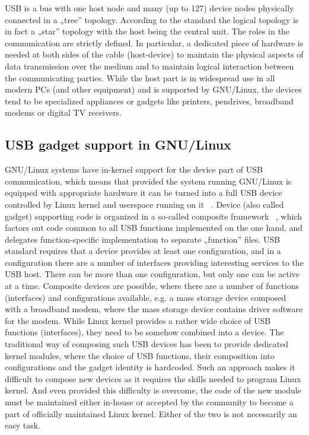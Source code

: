 \documentclass[10pt, a5paper]{article}
\begin{document}
USB is a bus with one host node and many (up to 127) device nodes physically connected in a „tree” topology. According to the standard the logical topology is in fact a „star” topology with the host being the central unit. The roles in the communication are strictly defined. In particular, a dedicated piece of hardware is needed at both sides of the cable (host-device) to maintain the physical aspects of data transmission over the medium and to maintain logical interaction \linebreak between the communicating parties. While the host part is in \linebreak widespread use in all modern PCs (and other equipment) and is \linebreak supported by GNU/Linux, the devices tend to be specialized appliances or gadgets like printers, pendrives, broadband modems or digital TV receivers.

\subsection*{USB gadget support in GNU/Linux}

GNU/Linux systems have in-kernel support for the device part of USB communication, which means that provided the system running GNU/Linux is equipped with appropriate hardware it can be turned into a full USB device controlled by Linux kernel and userspace running on it ~\cite{Pietrasiewicz7}. Device (also called gadget) supporting code is organized in a so-called composite framework ~\cite{Pietrasiewicz8}, which factors out code common to all USB functions implemented on the one hand, and delegates function-specific implementation to separate „function” files. USB standard \linebreak requires that a device provides at least one configuration, and in a configuration there are a number of interfaces providing interesting services to the USB host. There can be more than one configuration, but only one can be active at a time. Composite devices are possible, where there are a number of functions (interfaces) and configurations available, e.g. a mass storage device composed with a broadband modem, where the mass storage device contains driver software for the modem. While Linux kernel provides a rather wide choice of USB functions (interfaces), they need to be somehow combined into a device. The traditional way of composing such USB devices has been to provide dedicated kernel modules, where the choice of USB functions, their composition into configurations and the gadget identity is hardcoded. Such an approach makes it difficult to compose new devices as it requires the skills needed to program Linux kernel. And even provided this difficulty is overcome, the code of the new module must be maintained either in-house or accepted by the community to become a part of officially maintained Linux kernel. Either of the two is not necessarily an easy task.
\end{document}
